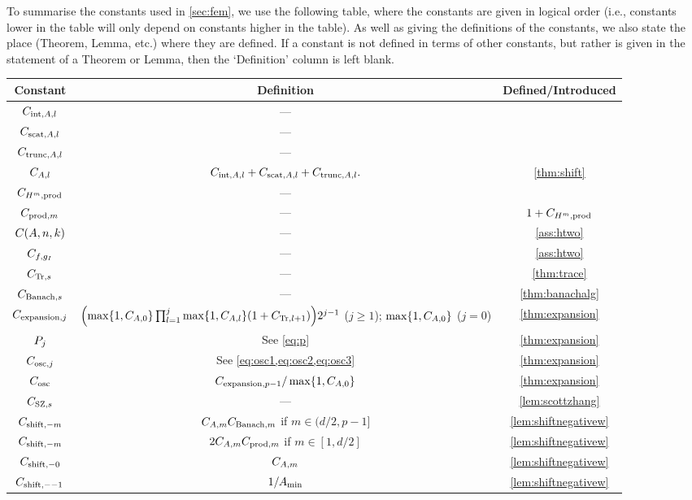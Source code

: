 To summarise the constants used in \cref{sec:fem}, we use the following table, where the constants are given in logical order (i.e., constants lower in the table will only depend on constants higher in the table). As well as giving the definitions of the constants, we also state the place (Theorem, Lemma, etc.) where they are defined. If a constant is not defined in terms of other constants, but rather is given in the statement of a Theorem or Lemma, then the `Definition' column is left blank.

\begin{longtabu}{ccc}
  \toprule
  Constant & Definition & Defined/Introduced\\
  \midrule
  \endhead
  $C_{\mathrm{int},A,l}$ & ---& \cite[Theorem 4.16]{Mc:00}\\
  $C_{\mathrm{scat},A,l}$ & ---& \cite[Theorem 4.18(i)]{Mc:00}\\
    $C_{\mathrm{trunc},A,l}$ & ---& \cite[Theorem 4.18(ii)]{Mc:00}\\
  $C_{A,l}$ & $C_{\mathrm{int},A,l} + C_{\mathrm{scat},A,l} + C_{\mathrm{trunc},A,l}.$ & \cref{thm:shift}\\
  $C_{H^{m},\mathrm{prod}}$&---&\cite[Theorem 3.20]{Mc:00}\\ 
  $C_{\mathrm{prod},m}$ &---& $1+C_{H^{m},\mathrm{prod}}$\\
  $\CAnk$ &---& \cref{ass:htwo}\\
  $C_{f,g_{I}}$ &---& \cref{ass:htwo}\\
  $C_{\mathrm{Tr},s}$ &---& \cref{thm:trace}\\
  $C_{\mathrm{Banach},s}$ & --- & \cref{thm:banachalg}\\
  $C_{\mathrm{expansion},j}$ & $\mleft(\max\set{1,\CAz} \prod_{l=1}^j \max\set{1,\CAfn{l}} \mleft(1+\CTrfn{l+1}\mright)\mright)2^{j-1}$ ($j \geq 1$); $\max\set{1,\CAz}$ ($j=0$)& \cref{thm:expansion}\\
  $P_{j}$ & See \cref{eq:p}& \cref{thm:expansion}\\
  $C_{\mathrm{osc},j}$ & See \cref{eq:osc1,eq:osc2,eq:osc3} & \cref{thm:expansion}\\
  $C_{\mathrm{osc}}$ & $\Cefn{p-1}/\max\set{1,\CAz}$ & \cref{thm:expansion}\\
  $C_{\mathrm{SZ},s}$ &---& \cref{lem:scottzhang}\\
  $C_{\mathrm{shift},-m}$ &$C_{A,m}C_{\mathrm{Banach},m}$ if $ m \in (d/2,p-1]$& \cref{lem:shiftnegativew}\\
    $C_{\mathrm{shift},-m}$ &$2C_{A,m}C_{\mathrm{prod},m}$ if $m \in [1,d/2]$& \cref{lem:shiftnegativew}\\
      $C_{\mathrm{shift},-0}$ &$C_{A,m}$& \cref{lem:shiftnegativew}\\
            $C_{\mathrm{shift},--1}$ &$1/A_{\min}$& \cref{lem:shiftnegativew}\\

\end{longtabu}
